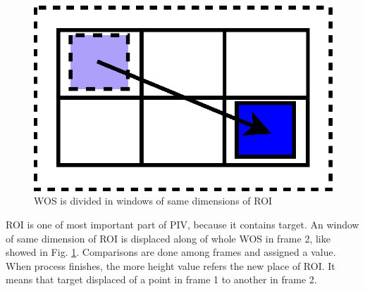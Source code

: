 \begin{figure}[H]
\includegraphics[width=\columnwidth]{images/WOSdivided.eps}
\caption{WOS is divided in windows of same dimensions of ROI}
\label{fig:WOSdivided}
\end{figure}

ROI is one of most important part of PIV, because it contains target. An window of same dimension of ROI is displaced
along of whole WOS in frame 2, like showed in Fig. \ref{fig:WOSdivided}. Comparisons are done among frames and 
assigned a value. 
When process finishes, the more height value refers the new place of ROI. It means that target displaced of a point in 
frame 1 to another in frame 2.